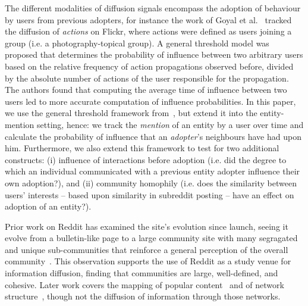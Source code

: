 \documentclass[sigconf]{acmart}
\begin{document}
The different modalities of diffusion signals encompass the adoption of behaviour by users from previous adopters, for instance the work of Goyal et al.~\cite{goyal2010learning} tracked the diffusion of \emph{actions} on Flickr, where actions were defined as users joining a group (i.e. a photography-topical group).
A general threshold model was proposed that determines the probability of influence between two arbitrary users based on the relative frequency of action propagations observed before, divided by the absolute number of actions of the user responsible for the propagation.
The authors found that computing the average time of influence between two users led to more accurate computation of influence probabilities.
In this paper, we use the general threshold framework from~\cite{goyal2010learning}, but extend it into the entity-mention setting, hence: we track the \emph{mention} of an entity by a user over time and calculate the probability of influence that an \emph{adopter}'s neighbours have had upon him.
Furthermore, we also extend this framework to test for two additional constructs: (i) influence of interactions before adoption (i.e. did the degree to which an individual communicated with a previous entity adopter influence their own adoption?), and (ii) community homophily (i.e. does the similarity between users' interests -- based upon similarity in subreddit posting -- have an effect on adoption of an entity?).

Prior work on Reddit has examined the site's evolution since launch, seeing it evolve from a bulletin-like page to a large community site with many segragated and unique sub-communities that reinforce a general perception of the overall community~\cite{singer2014evolution}.
This observation supports the use of Reddit as a study venue for information diffusion, finding that communities are large, well-defined, and cohesive.
Later work covers the mapping of popular content~\cite{weninger2015random} and of network structure~\cite{olson2015navigating}, though not the diffusion of information through those networks.
\end{document}
